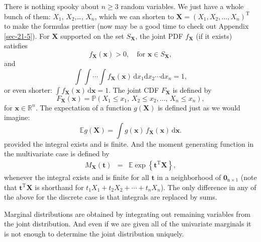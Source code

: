 There is nothing spooky about \(n\geq3\) random variables. We just
have a whole bunch of them: \(X_{1}\), \(X_{2}\),\ldots{}, \(X_{n}\), which
we can shorten to
\(\mathbf{X}=(X_{1},X_{2},\ldots,X_{n})^{\mathrm{T}}\) to make the
formulas prettier (now may be a good time to check out Appendix
\ref{sec-21-5}). For \(\mathbf{X}\) supported on the set
\(S_{\mathbf{X}}\), the joint PDF \(f_{\mathbf{X}}\) (if it exists)
satisfies
\begin{equation}
f_{\mathbf{X}}(\mathbf{x})>0,\quad \mbox{for }\mathbf{x}\in S_{\mathbf{X}},
\end{equation}
and
\begin{equation}
\int\!\!\!\int\cdots\int f_{\mathbf{X}}(\mathbf{x})\,\mathrm{d} x_{1}\mathrm{d} x_{2}\cdots\mathrm{d} x_{n}=1,
\end{equation}
or even shorter: \(\int
f_{\mathbf{X}}(\mathbf{x})\,\mathrm{d}\mathbf{x}=1\). The joint CDF
\(F_{\mathbf{X}}\) is defined by
\begin{equation}
F_{\mathbf{X}}(\mathbf{x})=\mathbb{P}(X_{1}\leq x_{1},\, X_{2}\leq x_{2},\ldots,\, X_{n}\leq x_{n}),
\end{equation}
for \(\mathbf{x}\in\mathbb{R}^{n}\). The expectation of a function
\(g(\mathbf{X})\) is defined just as we would imagine:
\begin{equation}
\mathbb{E} g(\mathbf{X})=\int g(\mathbf{x})\, f_{\mathbf{X}}(\mathbf{x})\,\mathrm{d}\mathbf{x}.
\end{equation}
provided the integral exists and is finite. And the moment generating
function in the multivariate case is defined by
\begin{eqnarray} 
M_{\mathbf{X}}(\mathbf{t}) & = & \mathbb{E}\exp\left\{ \mathbf{t}^{\mathrm{T}}\mathbf{X}\right\},
\end{eqnarray}
whenever the integral exists and is finite for all \(\mathbf{t}\) in a
neighborhood of \(\mathbf{0}_{\mathrm{n}\times1}\) (note that
\(\mathbf{t}^{\mathrm{T}}\mathbf{X}\) is shorthand for
\(t_{1}X_{1}+t_{2}X_{2}+\cdots+t_{n}X_{n}\)). The only difference in
any of the above for the discrete case is that integrals are replaced
by sums.

Marginal distributions are obtained by integrating out remaining
variables from the joint distribution. And even if we are given all of
the univariate marginals it is not enough to determine the joint
distribution uniquely.

